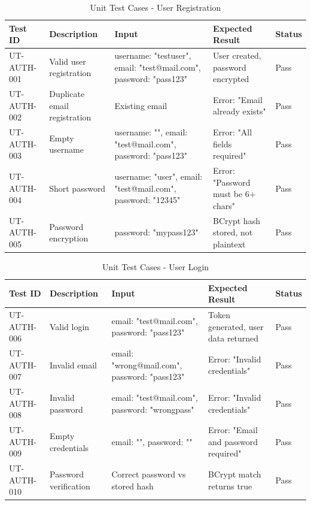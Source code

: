 \documentclass[12pt,a4paper]{article}
\begin{document}
    \begin{table}[H]
        \caption{Unit Test Cases - User Registration}
        \begin{tabular}{|p{2cm}|p{4cm}|p{3cm}|p{3cm}|p{1.5cm}|}
            \hline
            \textbf{Test ID} & \textbf{Description} & \textbf{Input} & \textbf{Expected Result} & \textbf{Status} \\
            \hline
            UT-AUTH-001 & Valid user registration & username: "testuser", email: "test@mail.com", password: "pass123" & User created, password encrypted & Pass \\
            \hline
            UT-AUTH-002 & Duplicate email registration & Existing email & Error: "Email already exists" & Pass \\
            \hline
            UT-AUTH-003 & Empty username & username: "", email: "test@mail.com", password: "pass123" & Error: "All fields required" & Pass \\
            \hline
            UT-AUTH-004 & Short password & username: "user", email: "test@mail.com", password: "12345" & Error: "Password must be 6+ chars" & Pass \\
            \hline
            UT-AUTH-005 & Password encryption & password: "mypass123" & BCrypt hash stored, not plaintext & Pass \\
            \hline
        \end{tabular}
    \end{table}

    \begin{table}[H]
        \caption{Unit Test Cases - User Login}
        \begin{tabular}{|p{2cm}|p{4cm}|p{3cm}|p{3cm}|p{1.5cm}|}
            \hline
            \textbf{Test ID} & \textbf{Description} & \textbf{Input} & \textbf{Expected Result} & \textbf{Status} \\
            \hline
            UT-AUTH-006 & Valid login & email: "test@mail.com", password: "pass123" & Token generated, user data returned & Pass \\
            \hline
            UT-AUTH-007 & Invalid email & email: "wrong@mail.com", password: "pass123" & Error: "Invalid credentials" & Pass \\
            \hline
            UT-AUTH-008 & Invalid password & email: "test@mail.com", password: "wrongpass" & Error: "Invalid credentials" & Pass \\
            \hline
            UT-AUTH-009 & Empty credentials & email: "", password: "" & Error: "Email and password required" & Pass \\
            \hline
            UT-AUTH-010 & Password verification & Correct password vs stored hash & BCrypt match returns true & Pass \\
            \hline
        \end{tabular}
    \end{table}
\end{document}
